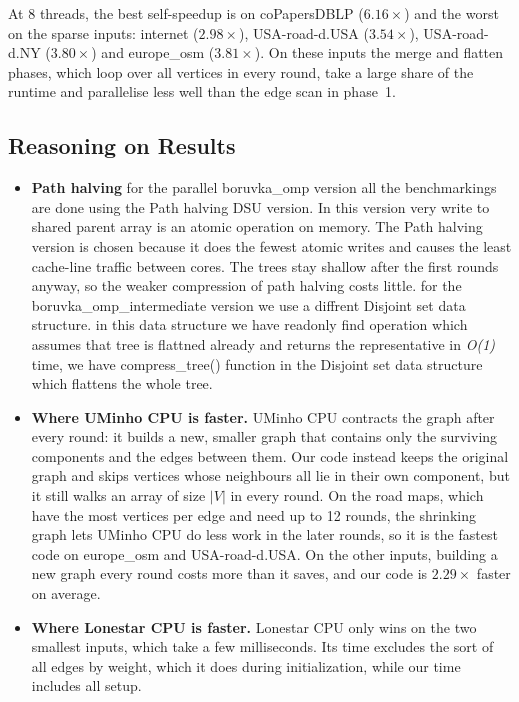 \documentclass[11pt,a4paper]{article}
\begin{document}
At 8 threads, the best self-speedup is on coPapersDBLP ($6.16\times$) and the worst on the
sparse inputs: internet ($2.98\times$), USA-road-d.USA ($3.54\times$), USA-road-d.NY
($3.80\times$) and europe\_osm ($3.81\times$). On these inputs the merge and flatten phases,
which loop over all vertices in every round, take a large share of the runtime and parallelise
less well than the edge scan in phase~1.
 
 
\subsection*{Reasoning on Results}
\begin{itemize}
    \item \textbf{Path halving}
        for the parallel boruvka\_omp version  all the benchmarkings are done using the Path halving DSU version. In this version very write to shared parent array is an atomic operation on memory. The Path halving version is chosen because it does the fewest atomic writes and causes the least cache-line traffic between cores. The trees stay shallow after the first rounds anyway, so the weaker compression of path halving costs little.
        for the boruvka\_omp\_intermediate version we use a diffrent Disjoint set data structure. in this data structure we have readonly find operation which assumes that tree is flattned already and returns the representative in \textit{O(1)} time, we have compress\_tree() function in the Disjoint set data structure which flattens the whole tree. 
        
  \item \textbf{Where UMinho CPU is faster.} UMinho CPU contracts the graph after every round: it builds a new, smaller graph that contains only the surviving components and the edges between them. Our code instead keeps the original graph and skips vertices whose neighbours all lie in their own component, 
  but it still walks an array of size $|V|$ in every round. On the road maps, which have the most vertices per edge and need up to 12 rounds, the shrinking graph lets UMinho CPU do less work in the later rounds, so it is the fastest code on europe\_osm and USA-road-d.USA. On the other inputs, building a new graph every round costs more than it saves, and our code is $2.29\times$ faster on average.

  
  \item \textbf{Where Lonestar CPU is faster.} Lonestar CPU only wins on the two smallest inputs, which take a few milliseconds. Its time excludes the sort of all edges by weight, which it does during initialization, while our time includes all setup. 


\end{itemize}
\end{document}

